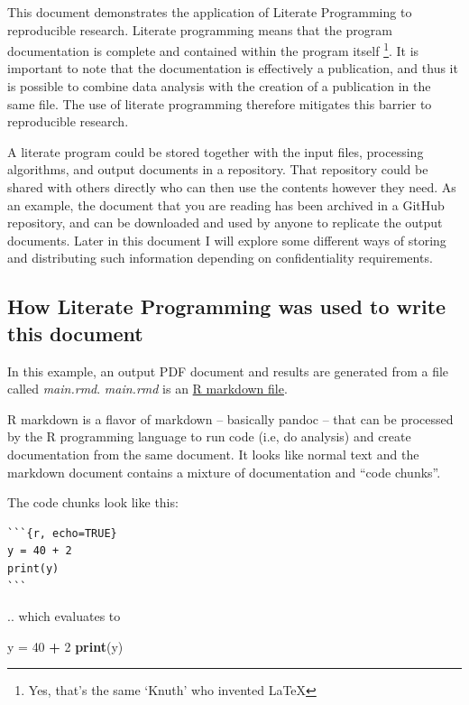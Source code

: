 \documentclass[11pt,]{article}
\newenvironment{Shaded}{\begin{snugshade}}{\end{snugshade}}
\newcommand{\DecValTok}[1]{\textcolor[rgb]{0.00,0.00,0.81}{#1}}
\newcommand{\KeywordTok}[1]{\textcolor[rgb]{0.13,0.29,0.53}{\textbf{#1}}}
\newcommand{\NormalTok}[1]{#1}
\newcommand{\OperatorTok}[1]{\textcolor[rgb]{0.81,0.36,0.00}{\textbf{#1}}}
\newcommand{\StringTok}[1]{\textcolor[rgb]{0.31,0.60,0.02}{#1}}
\let\rmarkdownfootnote\footnote%
\def\footnote{\protect\rmarkdownfootnote}
\begin{document}
This document demonstrates the application of Literate Programming to reproducible research. Literate programming means that the program documentation is complete and contained within the program itself \citep{Knuth1984}\footnote{Yes, that's the same `Knuth' who invented LaTeX}. It is important to note that the documentation is effectively a publication, and thus it is possible to combine data analysis with the creation of a publication in the same file. The use of literate programming therefore mitigates this barrier to reproducible research.

A literate program could be stored together with the input files, processing algorithms, and output documents in a repository. That repository could be shared with others directly who can then use the contents however they need. As an example, the document that you are reading has been archived in a GitHub repository, and can be downloaded and used by anyone to replicate the output documents. Later in this document I will explore some different ways of storing and distributing such information depending on confidentiality requirements.

\hypertarget{how-literate-programming-was-used-to-write-this-document}{%
\subsection{How Literate Programming was used to write this document}\label{how-literate-programming-was-used-to-write-this-document}}

In this example, an output PDF document and results are generated from a file called \emph{main.rmd}. \emph{main.rmd} is an \href{https://rmarkdown.rstudio.com/authoring_basics.html}{R markdown file}.

R markdown is a flavor of markdown -- basically pandoc -- that can be processed by the R programming language \citep{R-base} to run code (i.e, do analysis) and create documentation from the same document. It looks like normal text and the markdown document contains a mixture of documentation and ``code chunks''.

The code chunks look like this:

\begin{verbatim}
```{r, echo=TRUE}
y = 40 + 2
print(y)
```
\end{verbatim}

.. which evaluates to

\begin{Shaded}
\begin{Highlighting}[]
\NormalTok{y =}\StringTok{ }\DecValTok{40} \OperatorTok{+}\StringTok{ }\DecValTok{2}
\KeywordTok{print}\NormalTok{(y)}
\end{Highlighting}
\end{Shaded}
\end{document}

